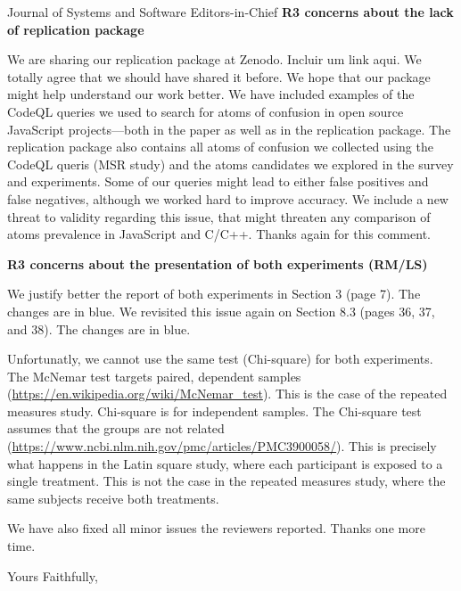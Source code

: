 \documentclass{letter}
\begin{document}
\begin{letter}{Journal of Systems and Software Editors-in-Chief}
{\bf R3 concerns about the lack of replication package}

We are sharing our replication package at Zenodo. {\color{red}Incluir um link aqui}.
We totally agree that we should have shared it before. We hope that our package might
help understand our work better. We have included examples of the CodeQL queries we used
to search for atoms of confusion in open source JavaScript projects---both in the paper
as well as in the replication package. The replication package also contains all atoms of
confusion we collected using the CodeQL queris (MSR study) and the atoms candidates
we explored in the survey and experiments. Some of our queries might lead to
either false positives and false negatives, although we worked hard to improve
accuracy. We include a new threat to validity regarding this issue, that might threaten
any comparison of atoms prevalence in JavaScript and C/C++. Thanks again for this comment.

{\bf R3 concerns about the presentation of both experiments (RM/LS)}

We justify better the report of both experiments in Section 3 (page 7). The changes
are in {\color{blue}blue}. We revisited this issue again on Section 8.3 (pages 36, 37, and
38). The changes are in {\color{blue}blue}.

Unfortunatly, we cannot use the same test (Chi-square) for both experiments. The McNemar test targets paired,
dependent samples (\url{https://en.wikipedia.org/wiki/McNemar_test}). This is the case of the repeated measures study.
Chi-square is for independent samples. The Chi-square test assumes that the groups are not related
(\url{https://www.ncbi.nlm.nih.gov/pmc/articles/PMC3900058/}). This is precisely what happens in the Latin square study,
where each participant is exposed to a single treatment. This is not the case in the repeated measures study,
where the same subjects receive both treatments. 


We have also fixed all minor issues the reviewers reported. Thanks one more time.

\closing{Yours Faithfully,}


\end{letter}
\end{document}
